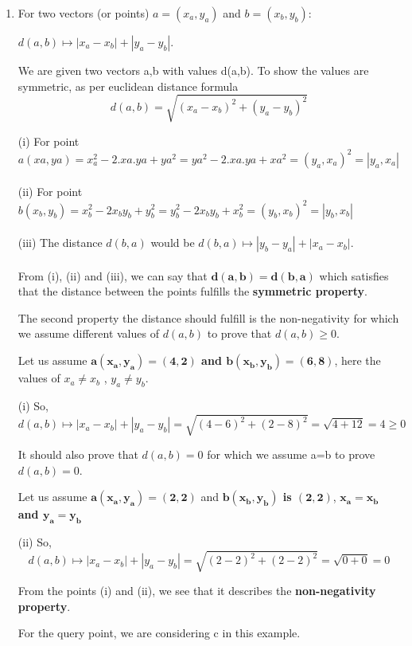     \begin{enumerate}

   \item\label{l1} 
   For two vectors (or points) $a=(x_a, y_a)$ and $b=(x_b, y_b)$:

 $d(a, b) \mapsto | x_a - x_b | + | y_a - y_b |$.  

We are given two vectors a,b with values d(a,b). To show the values are symmetric, as per euclidean distance formula 
        \[d(a,b) = \sqrt{(x_a-x_b)^2 + (y_a-y_b)^2}\]

        (i) For point $a(xa,ya) = x_a^2 - 2.xa.ya + ya^2 = ya^2 - 2.xa.ya + xa^2 = (y_a,x_a)^2 = |y_a,x_a|$\\\\
        (ii) For point $b(x_b,y_b) = x_b^2 - 2x_by_b + y_b^2 = y_b^2 - 2x_by_b + x_b^2 = (y_b,x_b)^2 = |y_b,x_b|$\\\\
        (iii) The distance $d(b,a)$ would be  $d(b, a) \mapsto | y_b - y_a | + | x_a - x_b |$.\\\\

        From (i), (ii) and (iii), we can say that $\mathbf{d(a,b)= d(b,a)}$ which satisfies that the distance between the points fulfills the \textbf{symmetric property}.

The second property the distance should fulfill is the non-negativity for which we assume different values of $d(a,b)$ to prove that $d(a,b) \geq 0$.

      Let us assume\textbf{ $\mathbf{a(x_a,y_a) = (4,2)}$ and $\mathbf{b(x_b,y_b) = (6,8)}$}, here the values of $x_a \neq x_b$ ,  $y_a \neq y_b$.
      
     (i) So, \[d(a, b) \mapsto | x_a - x_b | + | y_a - y_b |= \sqrt{(4-6)^2 + (2-8)^2 } = \sqrt {4 +12} = 4 \geq 0\]
     
     It should also prove that $d(a,b) = 0$ for which we assume a=b to prove $d(a,b)=0$.
    
     Let us assume\textbf{ $\mathbf{a(x_a,y_a) = (2,2)}$} and \textbf{$\mathbf{b(x_b,y_b)}$ is $\mathbf{(2,2)}$},\textbf{ $\mathbf{x_a = x_b}$ and $\mathbf{y_a = y_b}$}
    
     (ii) So, \[d(a, b) \mapsto | x_a - x_b | + | y_a - y_b |= \sqrt{(2-2)^2 + (2-2)^2 } = \sqrt {0 +0} = 0\]
    
    From the points (i) and (ii), we see that it describes the \textbf{non-negativity property}.

    For the query point, we are considering c in this example.
    

\end{enumerate}
